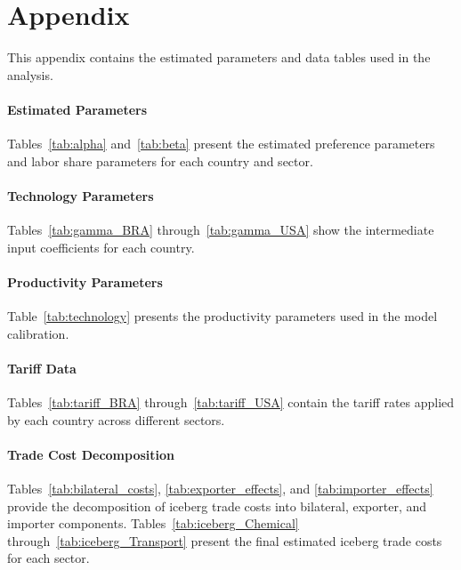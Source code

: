 \section*{Appendix}

This appendix contains the estimated parameters and data tables used in the analysis.

\paragraph{Estimated Parameters}
Tables~\ref{tab:alpha} and~\ref{tab:beta} present the estimated preference parameters and labor share parameters for each country and sector.

\paragraph{Technology Parameters}
Tables~\ref{tab:gamma_BRA} through~\ref{tab:gamma_USA} show the intermediate input coefficients for each country.

\paragraph{Productivity Parameters}
Table~\ref{tab:technology} presents the productivity parameters used in the model calibration.

\paragraph{Tariff Data}
Tables~\ref{tab:tariff_BRA} through~\ref{tab:tariff_USA} contain the tariff rates applied by each country across different sectors.

\paragraph{Trade Cost Decomposition}
Tables~\ref{tab:bilateral_costs}, \ref{tab:exporter_effects}, and \ref{tab:importer_effects} provide the decomposition of iceberg trade costs into bilateral, exporter, and importer components. Tables~\ref{tab:iceberg_Chemical} through~\ref{tab:iceberg_Transport} present the final estimated iceberg trade costs for each sector.


\begin{landscape}
\vspace*{\fill}

\vspace*{\fill}
\end{landscape}
\begin{landscape}
\vspace*{\fill}

\vspace*{\fill}
\end{landscape}

